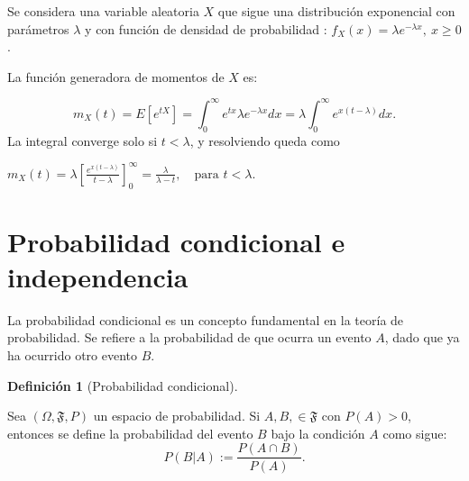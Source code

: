 \documentclass[
  us-letterpaper,
]{scrreprt}
\theoremstyle{plain}
\theoremstyle{plain}
\theoremstyle{definition}
\newtheorem{definition}{Definición}[chapter]
\theoremstyle{remark}
\begin{document}
\begin{tcolorbox}[enhanced jigsaw, titlerule=0mm, opacityback=0, coltitle=black, bottomrule=.15mm, colbacktitle=quarto-callout-caution-color!10!white, toprule=.15mm, colback=white, arc=.35mm, colframe=quarto-callout-caution-color-frame, leftrule=.75mm, bottomtitle=1mm, left=2mm, toptitle=1mm, opacitybacktitle=0.6, breakable, title={Ejemplo (\textbf{\emph{Función generadora de momentos}})}, rightrule=.15mm]

Se considera una variable aleatoria \(X\) que sigue una distribución
exponencial con parámetros \(\lambda\) y con función de densidad de
probabilidad : \(f_X(x) = \lambda e^{-\lambda x}, \ x \geq 0\).

La función generadora de momentos de \(X\) es:

\[
m_X(t) = E[e^{tX}] = \int_0^{\infty} e^{tx}\lambda e^{-\lambda x} dx = \lambda \int_0^{\infty} e^{x(t-\lambda)} dx.
\]La integral converge solo si \(t < \lambda\), y resolviendo queda como

\(m_X(t) = \lambda \left[\frac{e^{x(t - \lambda)}}{t - \lambda}\right]_{0}^{\infty} = \frac{\lambda}{\lambda - t}, \quad \text{para } t < \lambda.\)

\end{tcolorbox}

\section{Probabilidad condicional e
independencia}\label{sec-probabilidad-condicional-e-independencia}

La probabilidad condicional es un concepto fundamental en la teoría de
probabilidad. Se refiere a la probabilidad de que ocurra un evento
\(A\), dado que ya ha ocurrido otro evento \(B\).

\begin{definition}[Probabilidad
condicional]\protect\hypertarget{def-prob_cond}{}\label{def-prob_cond}

Sea \((\Omega, \mathfrak{F}, P)\) un espacio de probabilidad. Si
\(A, B, \in \mathfrak{F}\) con \(P(A) > 0\), entonces se define la
probabilidad del evento \(B\) bajo la condición \(A\) como sigue:
\[P(B | A) := \frac{P(A \cap B)}{P(A)}.\]

\end{definition}
\end{document}
